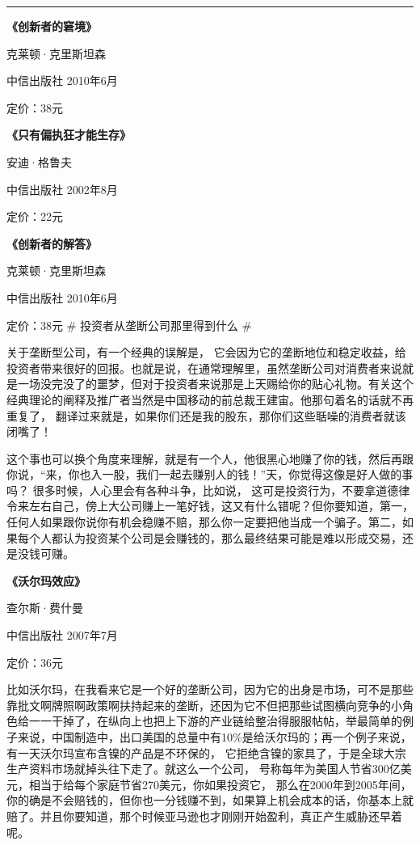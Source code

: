 \begin{center}\rule{3in}{0.4pt}\end{center}

\textbf{《创新者的窘境》}

克莱顿·克里斯坦森

中信出版社 2010年6月

定价：38元

\textbf{《只有偏执狂才能生存》}

安迪·格鲁夫

中信出版社 2002年8月

定价：22元

\textbf{《创新者的解答》}

克莱顿·克里斯坦森

中信出版社 2010年6月

定价：38元 \# 投资者从垄断公司那里得到什么 \#

关于垄断型公司，有一个经典的误解是，
它会因为它的垄断地位和稳定收益，给投资者带来很好的回报。也就是说，在通常理解里，虽然垄断公司对消费者来说就是一场没完没了的噩梦，但对于投资者来说那是上天赐给你的贴心礼物。有关这个经典理论的阐释及推广者当然是中国移动的前总裁王建宙。他那句着名的话就不再重复了，
翻译过来就是，如果你们还是我的股东，那你们这些聒噪的消费者就该闭嘴了！

这个事也可以换个角度来理解，就是有一个人，他很黑心地赚了你的钱，然后再跟你说，``来，你也入一股，我们一起去赚别人的钱！''天，你觉得这像是好人做的事吗？
很多时候，人心里会有各种斗争，比如说，
这可是投资行为，不要拿道德律令来左右自己，傍上大公司赚上一笔好钱，这又有什么错呢？但你要知道，第一，任何人如果跟你说你有机会稳赚不赔，那么你一定要把他当成一个骗子。第二，如果每个人都认为投资某个公司是会赚钱的，那么最终结果可能是难以形成交易，还是没钱可赚。

\textbf{《沃尔玛效应》}

查尔斯·费什曼

中信出版社 2007年7月

定价：36元

比如沃尔玛，在我看来它是一个好的垄断公司，因为它的出身是市场，可不是那些靠批文啊牌照啊政策啊扶持起来的垄断，还因为它不但把那些试图横向竞争的小角色给一一干掉了，在纵向上也把上下游的产业链给整治得服服帖帖，举最简单的例子来说，中国制造中，出口美国的总量中有10\%是给沃尔玛的；再一个例子来说，有一天沃尔玛宣布含镍的产品是不环保的，
它拒绝含镍的家具了，于是全球大宗生产资料市场就掉头往下走了。就这么一个公司，
号称每年为美国人节省300亿美元，相当于给每个家庭节省270美元，你如果投资它，
那么在2000年到2005年间，你的确是不会赔钱的，但你也一分钱赚不到，如果算上机会成本的话，你基本上就赔了。并且你要知道，那个时候亚马逊也才刚刚开始盈利，真正产生威胁还早着呢。

